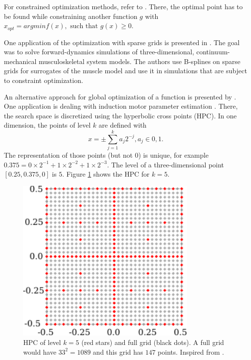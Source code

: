 For constrained optimization methods, refer to \cite{b_splines}. There, the optimal point has to be found while constraining another function $ g $ with $ x_{opt} = arg min f(x), \text{ such that } g(x) \ge 0 $. 
\newline 

One application of the optimization with sparse grids is presented in \cite{valentin2018gradient}. The goal was to solve forward-dynamics simulations of three-dimensional, continuum-mechanical musculoskeletal system models. The authors use B-splines on sparse grids for surrogates of the muscle model and use it in simulations that are subject to constraint optimization. 
\newline 

An alternative approach for global optimization of a function is presented by \cite{novak1996global}. One application is dealing with induction motor parameter estimation \cite{duan2016induction}. There, the search space is discretized using the hyperbolic cross points (HPC). In one dimension, the points of level $ k $ are defined with 
\begin{equation}
	x = \pm \sum_{j=1}^{k} a_j 2^{-j}, a_j \in {0,1}.
\end{equation}
The representation of those points (but not $ 0 $) is unique, for example $ 0.375 = 0 \times 2^{-1} + 1 \times 2^{-2} + 1 \times 2 ^{-3} $. The level of a three-dimensional point $ [0.25, 0.375, 0] $ is $ 5 $. Figure \ref{fig:hyperbolic} shows the HPC for $ k = 5 $.

\begin{figure}[H]
	\centering
	\includegraphics[width=0.8\textwidth]{figures/Fig_2_12_altern_sparse}
	\caption{ HPC of level $ k = 5 $ (red stars) and full grid (black dots). A full grid would have $ 33^2 = 1089 $ and this grid has $ 147 $ points. Inspired from \cite{duan2016induction}.}
	\label{fig:hyperbolic}
\end{figure}

